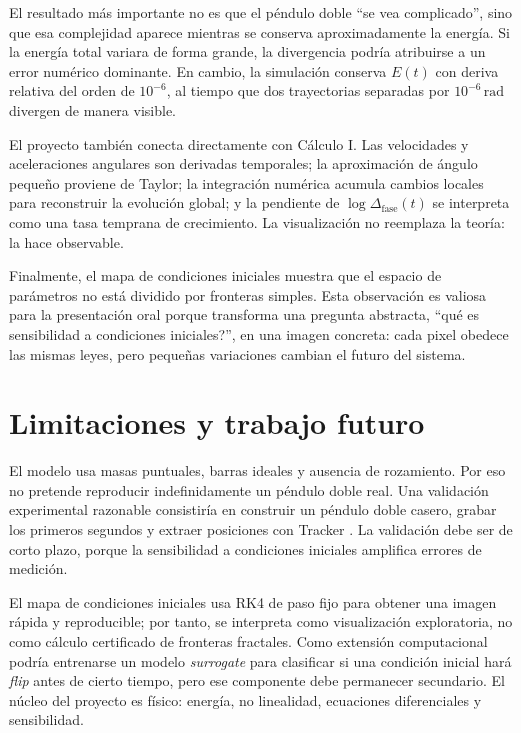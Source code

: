\documentclass[reprint,amsmath,amssymb,aps,pra,nofootinbib,floatfix,showkeys]{revtex4-2}
\newcommand{\Deltafase}{\Delta_{\mathrm{fase}}}
\begin{document}
El resultado m\'as importante no es que el p\'endulo doble ``se vea complicado'', sino que esa complejidad aparece mientras se conserva aproximadamente la energ\'ia. Si la energ\'ia total variara de forma grande, la divergencia podr\'ia atribuirse a un error num\'erico dominante. En cambio, la simulaci\'on conserva $E(t)$ con deriva relativa del orden de $10^{-6}$, al tiempo que dos trayectorias separadas por $10^{-6}\,\mathrm{rad}$ divergen de manera visible.

El proyecto tambi\'en conecta directamente con C\'alculo I. Las velocidades y aceleraciones angulares son derivadas temporales; la aproximaci\'on de \'angulo peque\~no proviene de Taylor; la integraci\'on num\'erica acumula cambios locales para reconstruir la evoluci\'on global; y la pendiente de $\log\Deltafase(t)$ se interpreta como una tasa temprana de crecimiento. La visualizaci\'on no reemplaza la teor\'ia: la hace observable.

Finalmente, el mapa de condiciones iniciales muestra que el espacio de par\'ametros no est\'a dividido por fronteras simples. Esta observaci\'on es valiosa para la presentaci\'on oral porque transforma una pregunta abstracta, ``\textquestiondown qu\'e es sensibilidad a condiciones iniciales?'', en una imagen concreta: cada pixel obedece las mismas leyes, pero peque\~nas variaciones cambian el futuro del sistema.

\section{Limitaciones y trabajo futuro}

El modelo usa masas puntuales, barras ideales y ausencia de rozamiento. Por eso no pretende reproducir indefinidamente un p\'endulo doble real. Una validaci\'on experimental razonable consistir\'ia en construir un p\'endulo doble casero, grabar los primeros segundos y extraer posiciones con Tracker \cite{tracker_video}. La validaci\'on debe ser de corto plazo, porque la sensibilidad a condiciones iniciales amplifica errores de medici\'on.

El mapa de condiciones iniciales usa RK4 de paso fijo para obtener una imagen r\'apida y reproducible; por tanto, se interpreta como visualizaci\'on exploratoria, no como c\'alculo certificado de fronteras fractales. Como extensi\'on computacional podr\'ia entrenarse un modelo \emph{surrogate} para clasificar si una condici\'on inicial har\'a \emph{flip} antes de cierto tiempo, pero ese componente debe permanecer secundario. El n\'ucleo del proyecto es f\'isico: energ\'ia, no linealidad, ecuaciones diferenciales y sensibilidad.
\end{document}
